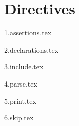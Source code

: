 
\section{Directives}
{
	\lipsum[1]
	
	{1.assertions.tex}
	
	{2.declarations.tex}
	
	{3.include.tex}
	
	{4.parse.tex}
	
	{5.print.tex}
	
	{6.skip.tex}
}


